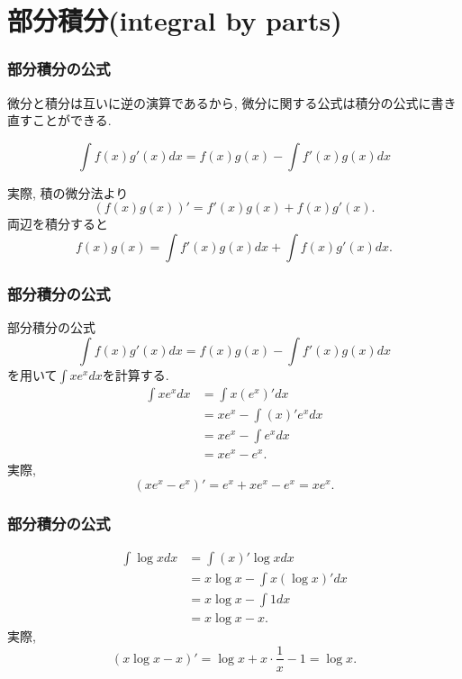 

\section{部分積分(integral by parts)}
\begin{frame}
\frametitle{部分積分の公式}

微分と積分は互いに逆の演算であるから, 微分に関する公式は積分の公式に書き直すことができる. 

\begin{Thm}[部分積分の公式]
$$
\int f(x)g'(x)dx = f(x)g(x) - \int f'(x)g(x)dx
$$
\end{Thm}

実際, 積の微分法より
$$
(f(x)g(x))'=f'(x)g(x)+f(x)g'(x). 
$$
両辺を積分すると
$$
f(x)g(x)=\int f'(x)g(x)dx +\int f(x)g'(x)dx.
$$


\end{frame}





\begin{frame}
\frametitle{部分積分の公式}

部分積分の公式
$$
\int f(x)g'(x)dx = f(x)g(x) - \int f'(x)g(x)dx
$$
を用いて$\int x e^x dx$を計算する. 
\begin{align*}
\int x e^x dx &= \int x(e^x)'dx \\
& = xe^x-\int(x)'e^xdx \\
&= xe^x-\int e^xdx \\
& = xe^x - e^x. 
\end{align*}
実際, 
$$
(xe^x - e^x)'=e^x+xe^x-e^x=xe^x. 
$$

\end{frame}







\begin{frame}
\frametitle{部分積分の公式}

\begin{align*}
\int \log x dx & = \int (x)'\log x dx \\
& = x \log x -\int x(\log x)'dx \\
&= x \log x - \int 1 dx \\
& = x\log x -x.  
\end{align*}
実際, 
$$
(x\log x -x)' = \log x + x \cdot \frac{1}{x}-1=\log x. 
$$


\end{frame}


